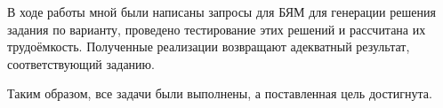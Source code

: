 
В ходе работы мной были написаны запросы для БЯМ для генерации решения задания по варианту, проведено тестирование этих решений и рассчитана их трудоёмкость. Полученные реализации возвращают адекватный результат, соответствующий заданию.

Таким образом, все задачи были выполнены, а поставленная цель достигнута.